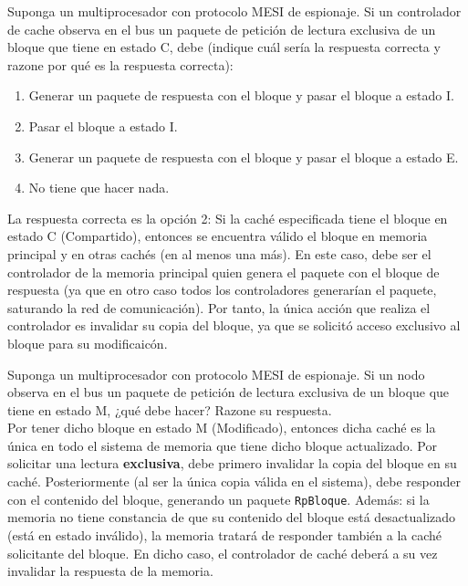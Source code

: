 \begin{cuestion}
    Suponga un multiprocesador con protocolo MESI de espionaje. Si un controlador de cache observa en el bus un paquete de petición de lectura exclusiva de un bloque que tiene en estado C, debe (indique cuál sería la respuesta correcta y razone por qué es la respuesta correcta):
    \begin{enumerate}
        \item Generar un paquete de respuesta con el bloque y pasar el bloque a estado I.
        \item Pasar el bloque a estado I.
        \item Generar un paquete de respuesta con el bloque y pasar el bloque a estado E.
        \item No tiene que hacer nada.
    \end{enumerate}

    La respuesta correcta es la opción 2: Si la caché especificada tiene el bloque en estado C (Compartido), entonces se encuentra válido el bloque en memoria principal y en otras cachés (en al menos una más). En este caso, debe ser el controlador de la memoria principal quien genera el paquete con el bloque de respuesta (ya que en otro caso todos los controladores generarían el paquete, saturando la red de comunicación). Por tanto, la única acción que realiza el controlador es invalidar su copia del bloque, ya que se solicitó acceso exclusivo al bloque para su modificaicón.
\end{cuestion}

\begin{cuestion}
    Suponga un multiprocesador con protocolo MESI de espionaje. Si un nodo observa en el bus un paquete de petición de lectura exclusiva de un bloque que tiene en estado M, ¿qué debe hacer? Razone su respuesta.\\

Por tener dicho bloque en estado M (Modificado), entonces dicha caché es la única en todo el sistema de memoria que tiene dicho bloque actualizado. Por solicitar una lectura \textbf{exclusiva}, debe primero invalidar la copia del bloque en su caché. Posteriormente (al ser la única copia válida en el sistema), debe responder con el contenido del bloque, generando un paquete \verb|RpBloque|. Además: si la memoria no tiene constancia de que su contenido del bloque está desactualizado (está en estado inválido), la memoria tratará de responder también a la caché solicitante del bloque. En dicho caso, el controlador de caché deberá a su vez invalidar la respuesta de la memoria.
\end{cuestion}

